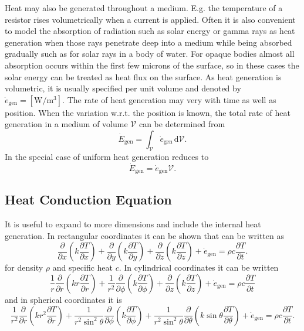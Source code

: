 Heat may also be generated throughout a medium.
E.g. the temperature of a resistor rises volumetrically when a current is applied.
Often it is also convenient to model the absorption of radiation such as solar energy or gamma rays as heat generation when those rays penetrate deep into a medium while being absorbed gradually such as for solar rays in a body of water.
For opaque bodies almost all absorption occurs within the first few microns of the surface, so in these cases the solar energy can be treated as heat flux on the surface. 
As heat generation is volumetric, it is usually specified per unit volume and denoted by $\dot{e}_{\text{gen}} = \left[ \unit{\W\per\m\cubed} \right]$.
The rate of heat generation may very with time as well as position.
When the variation w.r.t. the position is known, the total rate of heat generation in a medium of volume $\mathscr{V}$ can be determined from
\begin{equation} \label{eq:heatgenint}
  \dot{E}_{\text{gen}} = \int_{\mathscr{V}} \dot{e}_{\text{gen}} \, \mathrm{d}\mathscr{V}
.\end{equation}
In the special case of uniform heat generation  reduces to
\begin{equation*}
  \dot{E}_{\text{gen}} = \dot{e}_{\text{gen}} \mathscr{V}
.\end{equation*}


\subsection{Heat Conduction Equation}
It is useful to expand  to more dimensions and include the internal heat generation.
In rectangular coordinates it can be shown that  can be written as
\begin{equation} \label{eq:heatcondcart}
  \frac{\partial }{\partial x} \left( k \frac{\partial T}{\partial x}  \right) + \frac{\partial }{\partial y} \left( k \frac{\partial T}{\partial y}  \right) + \frac{\partial }{\partial z} \left( k \frac{\partial T}{\partial z}  \right) + \dot{e}_{\text{gen}} = \rho c \frac{\partial T}{\partial t} 
.\end{equation}
for density $\rho$ and specific heat $c$.
In cylindrical coordinates it can be written
\begin{equation*}
  \frac{1}{r} \frac{\partial }{\partial r} \left( k r \frac{\partial T}{\partial r}  \right) + \frac{1}{r^2} \frac{\partial }{\partial \phi}  \left( k \frac{\partial T}{\partial \phi}  \right) + \frac{\partial }{\partial z} \left( k \frac{\partial T}{\partial z}  \right) + \dot{e}_{\text{gen}} = \rho c \frac{\partial T}{\partial t}
\end{equation*}
and in spherical coordinates it is
\begin{equation*}
  \frac{1}{r^2} \frac{\partial }{\partial r} \left( kr^2 \frac{\partial T}{\partial r}  \right) + \frac{1}{r^2 \sin^2 \theta} \frac{\partial }{\partial \phi} \left( k  \frac{\partial T}{\partial \phi} \right) + \frac{1}{r^2 \sin^2 \theta}\frac{\partial }{\partial \theta} \left( k \sin \theta \frac{\partial T}{\partial \theta}  \right) + \dot{e}_{\text{gen}} = \rho c \frac{\partial T}{\partial t} 
.\end{equation*}

